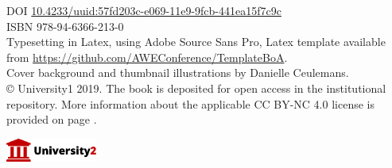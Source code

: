 DOI \href{https://doi.org/10.4233/uuid:57fd203c-e069-11e9-9fcb-441ea15f7c9c}{10.4233/uuid:57fd203c-e069-11e9-9fcb-441ea15f7c9c}\\
ISBN 978-94-6366-213-0\\

Typesetting in Latex, using Adobe Source Sans Pro, Latex template available from \href{https://github.com/AWEConference/TemplateBoA}{https://github.com/AWEConference/TemplateBoA}.\\

Cover background and thumbnail illustrations by Danielle Ceulemans.\\


© University1 2019. The book is deposited for open access in the institutional repository. More information about the applicable CC BY-NC 4.0 license is provided on page \pageref{awec:openaccesslicense}.

\vfill

\hspace{5mm}
\includegraphics[width=3cm]{figures/University2_Logo.pdf}

\newpage
